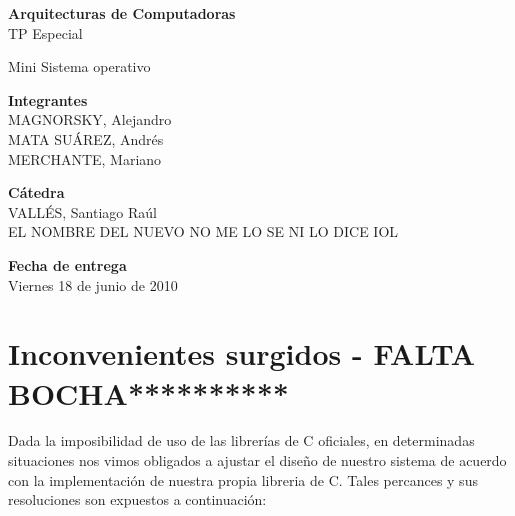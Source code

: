 \documentclass[a4paper,10pt]{article}
\begin{document}
\begin{center}
\textbf{\LARGE{Arquitecturas de Computadoras}}\\
\large{TP Especial}\par \noindent \newline \newline
\large{Mini Sistema operativo}
\end{center}
\par \noindent \newline \newline \newline \newline \newline \newline \newline
\newline \newline \newline \newline \newline
\large{\textbf{Integrantes}}\\
\indent \small{MAGNORSKY, Alejandro}\\
\indent \small{MATA SUÁREZ, Andrés}\\
\indent \small{MERCHANTE, Mariano}\newline
\par \noindent
\large{\textbf{Cátedra}}\\
\indent \small{VALLÉS, Santiago Raúl}\\
\indent \small{EL NOMBRE DEL NUEVO NO ME LO SE NI LO DICE IOL}\newline
\par \noindent
\large{\textbf{Fecha de entrega}}\\
\indent \small{Viernes 18 de junio de 2010}
\clearpage
\tableofcontents
\clearpage
\section{Inconvenientes surgidos - FALTA BOCHA**********}
\indent Dada la imposibilidad de uso de las librerías de C oficiales, en determinadas situaciones nos vimos obligados a
ajustar el diseño de nuestro sistema de acuerdo con la implementación de nuestra propia libreria de C. Tales percances
y sus resoluciones son expuestos a continuación:\\
\end{document}
